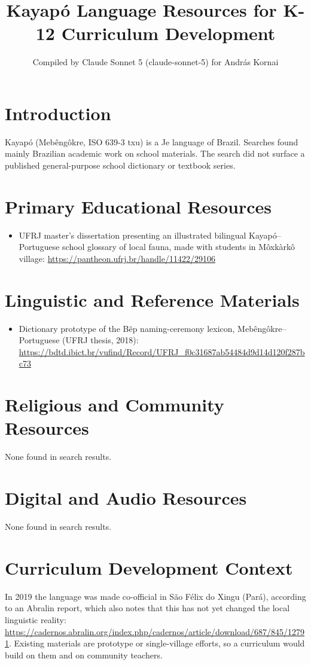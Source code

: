 \documentclass[12pt]{article}
\title{Kayap\'o Language Resources for K-12 Curriculum Development}
\author{Compiled by Claude Sonnet 5 (claude-sonnet-5) for Andr\'as Kornai}
\date{}
\begin{document}
\maketitle
\section{Introduction}
Kayap\'o (Mebêngôkre, ISO 639-3 txu) is a Je language of Brazil. Searches found mainly Brazilian academic work on school materials. The search did not surface a published general-purpose school dictionary or textbook series.
\section{Primary Educational Resources}
\begin{itemize}
\item UFRJ master's dissertation presenting an illustrated bilingual Kayap\'o--Portuguese school glossary of local fauna, made with students in M\^oxk\`ark\^o village: \url{https://pantheon.ufrj.br/handle/11422/29106}
\end{itemize}
\section{Linguistic and Reference Materials}
\begin{itemize}
\item Dictionary prototype of the B\~ep naming-ceremony lexicon, Mebêngôkre--Portuguese (UFRJ thesis, 2018): \url{https://bdtd.ibict.br/vufind/Record/UFRJ_f0c31687ab54484d9d14d120f287bc73}
\end{itemize}
\section{Religious and Community Resources}
None found in search results.
\section{Digital and Audio Resources}
None found in search results.
\section{Curriculum Development Context}
In 2019 the language was made co-official in S\~ao F\'elix do Xingu (Par\'a), according to an Abralin report, which also notes that this has not yet changed the local linguistic reality: \url{https://cadernos.abralin.org/index.php/cadernos/article/download/687/845/12791}. Existing materials are prototype or single-village efforts, so a curriculum would build on them and on community teachers.
\end{document}
